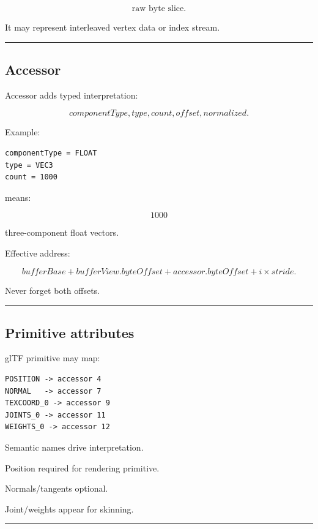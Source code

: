 \[
\boxed{
\text{raw byte slice}.
}
\]

It may represent interleaved vertex data or index stream.

\begin{center}\rule{0.5\linewidth}{0.5pt}\end{center}

\subsection{Accessor}\label{04-visual-computing-ii-ch041-accessor}

Accessor adds typed interpretation:

\[
componentType,
type,
count,
offset,
normalized.
\]

Example:

\begin{verbatim}
componentType = FLOAT
type = VEC3
count = 1000
\end{verbatim}

means:

\[
1000
\]

three-component float vectors.

Effective address:

\[
\boxed{
bufferBase
+
bufferView.byteOffset
+
accessor.byteOffset
+
i\times stride.
}
\]

Never forget both offsets.

\begin{center}\rule{0.5\linewidth}{0.5pt}\end{center}

\subsection{Primitive attributes}\label{04-visual-computing-ii-ch041-primitive-attributes}

glTF primitive may map:

\begin{verbatim}
POSITION -> accessor 4
NORMAL   -> accessor 7
TEXCOORD_0 -> accessor 9
JOINTS_0 -> accessor 11
WEIGHTS_0 -> accessor 12
\end{verbatim}

Semantic names drive interpretation.

Position required for rendering primitive.

Normals/tangents optional.

Joint/weights appear for skinning.

\begin{center}\rule{0.5\linewidth}{0.5pt}\end{center}

